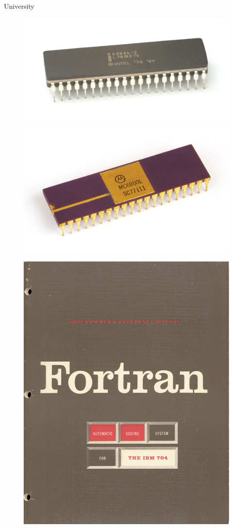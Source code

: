 \documentclass{beamer}
\begin{document}
  \begin{frame}{University}
    \begin{figure}
      \includegraphics[scale=0.1]{images/8086}
      \includegraphics[scale=0.5]{images/6800}
    \end{figure}
    \pause
    \begin{figure}
      \includegraphics[scale=0.1]{images/fortran}

\end{figure}
\end{frame}
\end{document}
